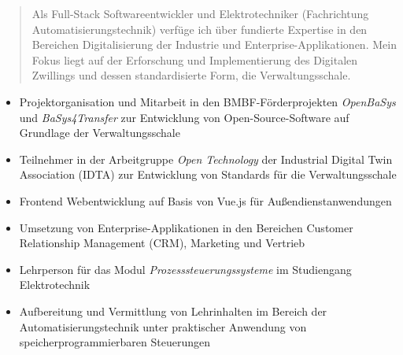 \documentclass[10pt,a4paper,ragged2e,withhyper]{altacv}
\begin{document}
\begin{paracol}{2}
            \begin{quote}
                Als Full-Stack Softwareentwickler und Elektrotechniker (Fachrichtung Automatisierungstechnik) verfüge ich über fundierte Expertise in den Bereichen Digitalisierung der Industrie und Enterprise-Applikationen.
                Mein Fokus liegt auf der Erforschung und Implementierung des Digitalen Zwillings und dessen standardisierte Form, die Verwaltungsschale.
            \end{quote}
        
            \begin{itemize}
                \item Projektorganisation und Mitarbeit in den BMBF-Förderprojekten \textit{OpenBaSys}\\ und \textit{BaSys4Transfer} zur Entwicklung von Open-Source-Software auf Grundlage der Verwaltungsschale
                \item Teilnehmer in der Arbeitgruppe \textit{Open Technology} der Industrial Digital Twin Association (IDTA) zur Entwicklung von Standards für die Verwaltungsschale
            \end{itemize}
            \divider
            
            \begin{itemize}
                \item Frontend Webentwicklung auf Basis von Vue.js für Außendienstanwendungen
                \item Umsetzung von Enterprise-Applikationen in den Bereichen Customer Relationship Management (CRM), Marketing und Vertrieb
            \end{itemize}
            \divider

            \begin{itemize}
                \item Lehrperson für das Modul \textit{Prozesssteuerungssysteme} im Studiengang Elektrotechnik
                \item Aufbereitung und Vermittlung von Lehrinhalten im Bereich der Automatisierungstechnik unter praktischer Anwendung von speicherprogrammierbaren Steuerungen
            \end{itemize}
        

\end{paracol}
\end{document}
